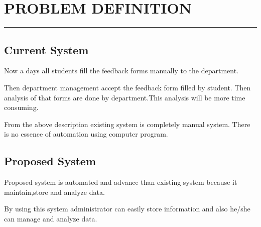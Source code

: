 \documentclass[12 pt,a4paper]{report}
\begin{document}
\chapter{PROBLEM DEFINITION}
\begin{center}
\rule{\textwidth}{2 pt}
\justify
\section{Current System}
\justify
Now a days all students fill the feedback forms manually to the department.\par
\justify
Then department management accept the feedback form filled by student. Then analysis of that forms are done by department.This analysis will be more time consuming.\par
\justify
From the above description existing system is completely manual system. There is no essence of automation using computer program.\par
\section{Proposed System}
\justify
Proposed system is automated and advance than existing system because it maintain,store and analyze data.\par
\justify
By using this system administrator can easily store information and also he/she can manage and analyze data. 
\end{center}
\end{document}
